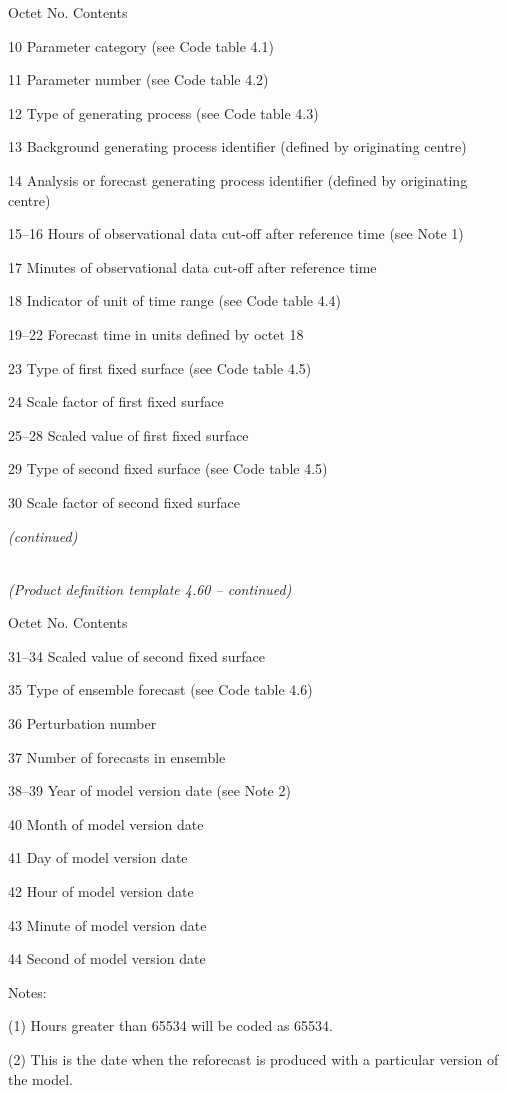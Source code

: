 Octet No. Contents

10 Parameter category (see Code table 4.1)

11 Parameter number (see Code table 4.2)

12 Type of generating process (see Code table 4.3)

13 Background generating process identifier (defined by originating centre)

14 Analysis or forecast generating process identifier (defined by originating centre)

15--16 Hours of observational data cut-off after reference time (see Note 1)

17 Minutes of observational data cut-off after reference time

18 Indicator of unit of time range (see Code table 4.4)

19--22 Forecast time in units defined by octet 18

23 Type of first fixed surface (see Code table 4.5)

24 Scale factor of first fixed surface

25--28 Scaled value of first fixed surface

29 Type of second fixed surface (see Code table 4.5)

30 Scale factor of second fixed surface

\emph{(continued)}

\emph{\\
(Product definition template 4.60 -- continued)}

Octet No. Contents

31--34 Scaled value of second fixed surface

35 Type of ensemble forecast (see Code table 4.6)

36 Perturbation number

37 Number of forecasts in ensemble

38--39 Year of model version date (see Note 2)

40 Month of model version date

41 Day of model version date

42 Hour of model version date

43 Minute of model version date

44 Second of model version date

Notes:

(1) Hours greater than 65534 will be coded as 65534.

(2) This is the date when the reforecast is produced with a particular version of the model.

